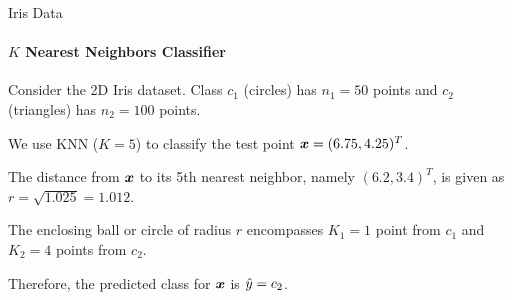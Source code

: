 \begin{frame}{Iris Data}
\framesubtitle{$K$ Nearest Neighbors Classif\/{i}er }

 Consider the 2D Iris dataset.
  Class $c_1$ (circles) has $n_1=50$ points
  and $c_2$ (triangles) has $n_2 = 100$ points.

	\medskip

We use KNN ($K=5$) to classify the test point ${\boldsymbol x} = (6.75, 4.25)^T$.


\medskip

The distance from ${\boldsymbol x}$ to its 5th
  nearest neighbor, namely $(6.2,3.4)^T$, is given as
  $r = \sqrt{1.025} = 1.012$. 


	\medskip

The enclosing ball or circle of radius $r$
encompasses $K_1 = 1$ point from 
  $c_1$ and $K_2 = 4$ points from $c_2$. 


	\medskip

	Therefore, the predicted
  class for ${\boldsymbol x}$ is $\hat{y} = c_2$.


\end{frame}

